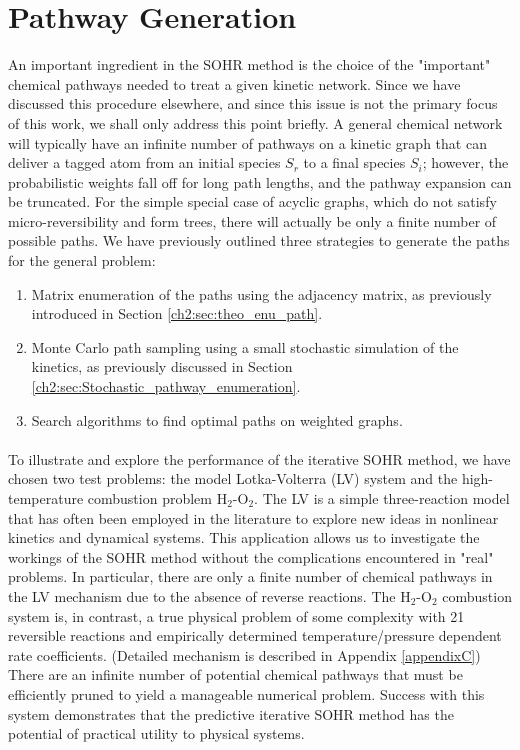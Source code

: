 \section{Pathway Generation}
\label{ch4:sec:path_generation}
An important ingredient in the
SOHR method is the choice of the "important" chemical
pathways needed to treat a given kinetic network. Since we
have discussed this procedure elsewhere\cite{ch4_10_bai2016sum}, and since this issue
is not the primary focus of this work, we shall only address this
point briefly. A general chemical network will typically have an
infinite number of pathways on a kinetic graph that can deliver
a tagged atom from an initial species $S_r$ to a final species $S_i$;
however, the probabilistic weights fall off for long path lengths,
and the pathway expansion can be truncated. For the simple
special case of acyclic graphs, which do not satisfy micro-reversibility
and form trees, there will actually be only a finite
number of possible paths. We have previously outlined three
strategies to generate the paths for the general problem:
\begin{enumerate}
\item Matrix enumeration of the paths using the adjacency matrix, as previously introduced in Section \ref{ch2:sec:theo_enu_path}.
\item Monte Carlo path sampling using a small stochastic simulation of the kinetics, as previously discussed in Section \ref{ch2:sec:Stochastic_pathway_enumeration}.
\item Search algorithms to find optimal paths on weighted graphs.\cite{ch1_IRPC_40_leiserson2001introduction, ch1_IRPC_41_dijkstra1959note, ch1_IRPC_42_bellman1958routing, ch1_IRPC_43_hart1968formal, ch1_IRPC_44_eppstein1998finding, ch1_IRPC_45_harary1997dynamic}
\end{enumerate}
\paragraph{}
To illustrate and explore the performance of the iterative
SOHR method, we have chosen two test problems: the model
Lotka-Volterra (LV) system and the high-temperature
combustion problem H$_2$-O$_2$. The LV is a simple three-reaction
model that has often been employed in the literature to explore
new ideas in nonlinear kinetics and dynamical systems. This
application allows us to investigate the workings of the SOHR
method without the complications encountered in "real"
problems. In particular, there are only a finite number of
chemical pathways in the LV mechanism due to the absence of
reverse reactions. The H$_2$-O$_2$ combustion system is, in contrast,
a true physical problem of some complexity with 21 reversible
reactions and empirically determined temperature/pressure dependent 
rate coefficients. (Detailed mechanism is described in Appendix \ref{appendixC}) There are an infinite number of
potential chemical pathways that must be efficiently pruned to
yield a manageable numerical problem. Success with this system
demonstrates that the predictive iterative SOHR method has
the potential of practical utility to physical systems.
